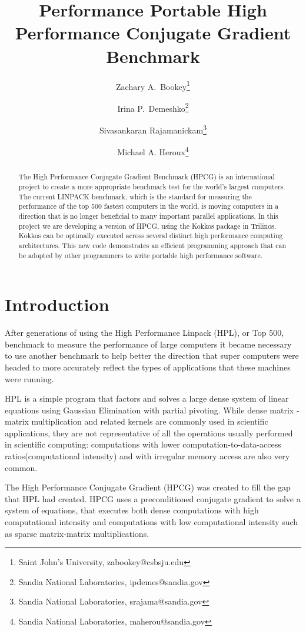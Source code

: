 \documentclass{ccr15}
\title{Performance Portable High Performance Conjugate Gradient Benchmark}
\author{Zachary A.\ Bookey\thanks{Saint John's University, zabookey@csbsju.edu} \and Irina P.\ Demeshko\thanks{Sandia National Laboratories,
ipdemes@sandia.gov} \and Sivasankaran Rajamanickam\thanks{Sandia National Laboratories, srajama@sandia.gov}\and Michael A. Heroux\thanks{Sandia National Laboratories, maherou@sandia.gov}}
\begin{document}
\maketitle
\begin{abstract}
The High Performance Conjugate Gradient Benchmark (HPCG) is an international project to create a
more appropriate benchmark test for the world's largest computers. The current LINPACK benchmark,
which is the standard for measuring the performance of the top 500 fastest computers in the
world, is moving computers in a direction that is no longer beneficial to many important
parallel applications. In this project we are developing a version of HPCG, using the Kokkos
package in Trilinos. Kokkos can be optimally executed across several distinct high
performance computing architectures. 
This new code demonstrates an efficient programming
approach that can be adopted by other programmers to write portable high performance software.
\end{abstract}

\section{Introduction}

After generations of using the High Performance Linpack (HPL), or Top 500, benchmark \cite{ZAB:Top500} to measure the
performance of large computers it became necessary to use another benchmark to help better the
direction that super computers were headed to more accurately reflect the types of applications
that these machines were running.

HPL is a simple program that factors and solves a large dense system of linear equations using
Gaussian Elimination with partial pivoting.
While dense matrix - matrix multiplication and related kernels are commonly used in scientific applications,
they are not representative of all the operations usually performed in scientific computing:
computations with lower computation-to-data-access ratios(computational intensity) and with
irregular memory access are also very common.

The High Performance Conjugate Gradient (HPCG)\cite{ZAB:TechHPCG}\cite{ZAB:TechHPCG2} was created to fill the gap that HPL had created.
HPCG uses a preconditioned conjugate gradient to solve a system of equations, that executes both
dense computations with high computational intensity and computations with low computational intensity such as sparse matrix-matrix multiplications.
\end{document}
